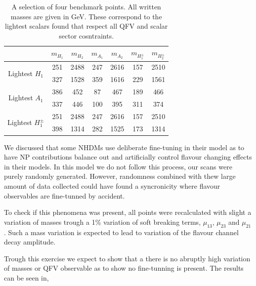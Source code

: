 %
\begin{table}[H]
\centering
\begin{tabular}{c|c|c|c|c|c|c|}
\cline{2-7} 
                                                          & $m_{H_1}$ & $m_{H_2}$ & $m_{A_1}$ & $m_{A_2}$ & $m_{H^\pm_1}$ & $m_{H^\pm_2}$ \\ \hline
\multicolumn{1}{|c|}{\multirow{2}{*}{Lightest $H_1$}}     & 251 & 2488 & 247 & 2616 & 157 & 2510  \\ \cline{2-7} 
\multicolumn{1}{|c|}{}                                    & 327 & 1528 & 359 & 1616 & 229 & 1561  \\ \hline
\multicolumn{1}{|c|}{\multirow{2}{*}{Lightest $A_1$}}     & 386 & 452  & 87  & 467 & 189  & 466  \\ \cline{2-7} 
\multicolumn{1}{|c|}{}                                    & 337 & 446  & 100 & 395 & 311  & 374  \\ \hline
\multicolumn{1}{|c|}{\multirow{2}{*}{Lightest $H^\pm_1$}} & 251 & 2488 & 247 & 2616 & 157 & 2510 \\ \cline{2-7} 
\multicolumn{1}{|c|}{}                                    & 398 & 1314 & 282 & 1525 & 173 & 1314 \\ \hline
\end{tabular}
\caption{A selection of four benchmark points. All written masses are given in GeV. These correspond to the lightest scalars found that respect all QFV and scalar sector cosntraints.}
\end{table}

We discussed that some NHDMs use deliberate fine-tuning in their model as to have NP contributions balance out and artificially control flavour changing effects in their models. In this model we do not follow this process, our scans were purely randomly generated.  
%
However, randomness combined with thew large amount of data collected could have found a syncronicity where flavour observables are fine-tunned by accident. 
%

To check if this phenomena was present, all points were recalculated with slight a variation of masses trough a 1\% variation of soft breaking terms, $\mu_{13}$, $\mu_{23}$ and $\mu_{21}$. 
%
Such a mass variation is expected to lead to variation of the flavour channel decay amplitude. 

Trough this exercise we expect to show that a there is no abruptly high variation of masses or QFV observable as to show no fine-tunning is present.
% 
The results can be seen in, 

